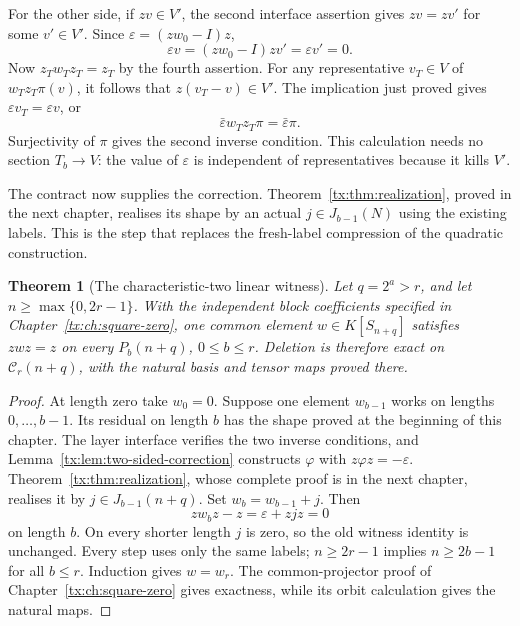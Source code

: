 \documentclass[11pt,a4paper,oneside,openany]{book}
\newtheorem{theorem}{Theorem}[chapter]
\theoremstyle{definition}\newtheorem{definition}[theorem]{Definition}
\theoremstyle{remark}\newtheorem{remark}[theorem]{Remark}
\numberwithin{equation}{chapter}
\begin{document}
For the other side, if $zv\in V'$, the second interface assertion gives $zv=zv'$ for some $v'\in V'$. Since $\varepsilon=(zw_0-I)z$,
\[
       \varepsilon v=(zw_0-I)zv'=\varepsilon v'=0.
\]
Now $z_Tw_Tz_T=z_T$ by the fourth assertion. For any representative $v_T\in V$ of $w_Tz_T\pi(v)$, it follows that $z(v_T-v)\in V'$. The implication just proved gives $\varepsilon v_T=\varepsilon v$, or
\[
               \bar\varepsilon w_Tz_T\pi=\bar\varepsilon\pi.
\]
Surjectivity of $\pi$ gives the second inverse condition. This calculation needs no section $T_b\to V$: the value of $\varepsilon$ is independent of representatives because it kills $V'$.

The contract now supplies the correction. Theorem~\ref{tx:thm:realization}, proved in the next chapter, realises its shape by an actual $j\in J_{b-1}(N)$ using the existing labels. This is the step that replaces the fresh-label compression of the quadratic construction.

\begin{theorem}[The characteristic-two linear witness]\label{tx:thm:witness2}
Let $q=2^a>r$, and let $n\ge\max\{0,2r-1\}$. With the independent
block coefficients specified in Chapter~\ref{tx:ch:square-zero}, one
common element $w\in K[S_{n+q}]$ satisfies $zwz=z$ on every
$P_b(n+q)$, $0\le b\le r$. Deletion is therefore exact on
$\mathcal C_r(n+q)$, with the natural basis and tensor maps proved
there.
\end{theorem}
\begin{proof}
At length zero take $w_0=0$. Suppose one element $w_{b-1}$ works
on lengths $0,\ldots,b-1$. Its residual on length $b$ has the
shape proved at the beginning of this chapter. The layer interface
verifies the two inverse conditions, and Lemma~\ref{tx:lem:two-sided-correction}
constructs $\varphi$ with $z\varphi z=-\varepsilon$. Theorem~\ref{tx:thm:realization}, whose
complete proof is in the next chapter, realises it by
$j\in J_{b-1}(n+q)$. Set $w_b=w_{b-1}+j$. Then
\[
 z w_b z-z=\varepsilon+zjz=0
\]
on length $b$. On every shorter length $j$ is zero, so the old
witness identity is unchanged. Every step uses only the same labels;
$n\ge2r-1$ implies $n\ge2b-1$ for all $b\le r$. Induction gives
$w=w_r$. The common-projector proof of Chapter~\ref{tx:ch:square-zero} gives
exactness, while its orbit calculation gives the natural maps.
\end{proof}
\end{document}
